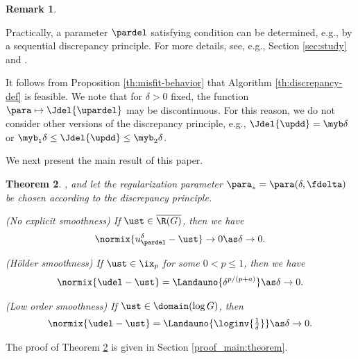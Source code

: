 \documentclass[10pt]{article}
\newtheorem{theorem}{Theorem}
\theoremstyle{definition}
\newtheorem{remark}[theorem]{Remark}
\begin{document}
%
\begin{remark}
\begin{myenumerate}
\item
Practically, a parameter $ \pardel $ satisfying condition  can be determined, e.g., by a sequential discrepancy principle.
For more details, see, e.g.,
Section \ref{sec:study} and \cite{HofPla20}.

\item
It follows from Proposition \ref{th:misfit-behavior} that Algorithm
\ref{th:discrepancy-def} is feasible. We note that for $ \delta > 0 $ fixed, the function $ \para \mapsto \Jdel{\upardel} $ may be discontinuous. For this reason, we do not consider other versions of the discrepancy principle, e.g.,
$ \Jdel{\updd} = \myb \delta $ or
$ \myb_1 \delta \le \Jdel{\updd} \le \myb_2 \delta $.
\end{myenumerate}
\end{remark}

We next present the main result of this paper.
%
\begin{theorem}
\label{th:discrepancy_main_result}
\mainassumpb, and let the regularization parameter $\para_*=\para(\delta,\fdelta)$ be chosen according to the discrepancy principle.
%
\begin{mylist}
\item (No explicit smoothness)
If $ \ust \in \overline{\R(G)} $, then
%
we have
%
$$
\normix{u_{\pardel}^\delta-\ust} \to 0
\as \delta \to 0.
$$
%

\item (H\"older smoothness)
If $ \ust \in \ix_p $ for some $ 0 < p \le 1 $,
then
we have
%
\begin{align*}
\normix{\udel -\ust} = \Landauno{\delta^{p/(p+a)}}
\as \delta \to 0.
\end{align*}
%
\item (Low order smoothness)
If $ \ust \in \domain(\log G) $,
then
%
\begin{align*}
\normix{\udel -\ust} = \Landauno{\loginv{\tfrac{1}{\delta}}} \as \delta \to 0.
\end{align*}%
\end{mylist}%
\end{theorem}%
%
The proof of Theorem \ref{th:discrepancy_main_result} is given in Section
\ref{proof_main:theorem}.
\end{document}
